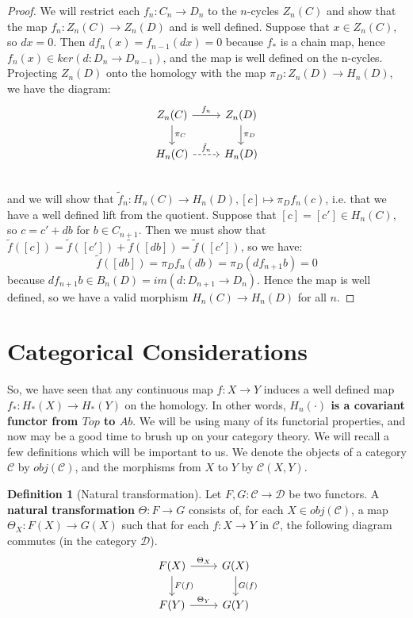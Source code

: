 \documentclass[11pt, oneside]{amsart}   	%
\theoremstyle{definition}
\newtheorem{definition}{Definition}[section]
\begin{document}
\begin{proof}
	We will restrict each $f_n : C_n\rightarrow D_n$ to the $n$-cycles $Z_n(C)$ and show that the map $f_n : Z_n(C)
	\rightarrow Z_n(D)$ and is well defined. Suppose that $x\in Z_n(C)$, so $dx = 0$. Then $df_n(x) = f_{n - 1}(dx) = 0$ 
	because $f_*$ is a chain map, hence $f_n(x)\in ker (d : D_n\rightarrow D_{n - 1})$, and the map is well defined on the 
	n-cycles. Projecting $Z_n(D)$ onto the homology with the map $\pi_D : Z_n(D)\rightarrow H_n(D)$, we have the 
	diagram:
	\[\begin{tikzcd}
		Z_n(C)\arrow[d, "\pi_C"]\arrow[r, "f_n"] & Z_n(D)\arrow[d, "\pi_D"] \\
		H_n(C)\arrow[r, dashed, "\tilde f_n"] & H_n(D) \\
	\end{tikzcd}\]
	and we will show that $\tilde f_n : H_n(C)\rightarrow H_n(D), [c]\mapsto \pi_D f_n(c)$, i.e. that we have a well defined 
	lift from the quotient. Suppose that $[c] = [c']\in H_n(C)$, so $c = c' + db$ for $b\in C_{n + 1}$. Then we must show that 
	$\tilde f([c]) = \tilde f([c']) + \tilde f([db]) = \tilde f([c'])$, so we have:
	\begin{equation}
		\tilde f([db]) = \pi_D f_n(db) = \pi_D (d f_{n + 1}b) = 0
	\end{equation}
	because $df_{n + 1} b\in B_n(D) = im(d : D_{n + 1}\rightarrow D_n)$. Hence the map is well defined, so we have a 
	valid morphism $H_n(C)\rightarrow H_n(D)$ for all $n$. 
\end{proof}

\newpage
\section{Categorical Considerations}

So, we have seen that any continuous map $f : X\rightarrow Y$ induces a well defined map $f_* : H_*(X)\rightarrow H_*(Y)$ 
on the homology. In other words, \textbf{$H_n(\cdot)$ is a covariant functor from $Top$ to $Ab$}. We will be using many 
of its functorial properties, and now may be a good time to brush up on your category theory. We will recall a few definitions 
which will be important to us. We denote the objects of a category $\mathcal C$ by $obj(\mathcal C)$, and the morphisms 
from $X$ to $Y$ by $\mathcal C(X, Y)$. 

\begin{definition}[Natural transformation]
	Let $F, G : \mathcal C\rightarrow\mathcal D$ be two functors. A \textbf{natural transformation} $\Theta : F\rightarrow G$ 
	consists of, for each $X\in obj(\mathcal C)$, a map $\Theta_X : F(X)\rightarrow G(X)$ such that for each 
	$f : X\rightarrow Y$ in $\mathcal C$, the following diagram commutes (in the category $\mathcal D$). 
	\begin{equation}\begin{tikzcd}
		F(X)\arrow[r, "\Theta_X"]\arrow[d, "F(f)"] & G(X)\arrow[d, "G(f)"] \\
		F(Y)\arrow[r, "\Theta_Y"] & G(Y) \\
	\end{tikzcd}\end{equation}
\end{definition}
\end{document}

